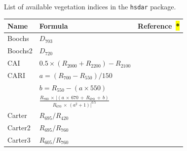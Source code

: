 \documentclass[remotesensing,article,accept,moreauthors,pdftex]{Definitions/mdpi}
\begin{document}
\begin{paracol}{2}
\subsection{}
\vspace{-12pt}
\renewcommand{\thespecialtable}{A\arabic{specialtable}}
\begin{specialtable}[H]
\setlength{\tabcolsep}{10.4mm}
{
	\caption{List of available vegetation indices in the \texttt{hsdar} package.}
	\begin{tabular}{lll}\toprule
		\bfseries{Name} & \bfseries{Formula}                                                                                   & \bfseries{Reference~\hl{*}} %
         \\		\midrule
		Boochs          & $D_{703}$                                                                                            &~\cite{boochs1990}             \\
		Boochs2         & $D_{720}$                                                                                            &~\cite{boochs1990}             \\
		CAI             & $0.5 \times (R_{2000} + R_{2200}) -R_{2100}$                                                         &~\cite{nagler2003}             \\
		\midrule
		CARI            & $a = (R_{700}-R_{550}) / 150$                                                                        &~\cite{walthall1994}           \\
		& $b = R_{550}-(a\times 550)$                                                                          &                               \\
		& $\frac{R_{700}\,\times\, | (a\,\times\,670\,+\,R_{670}\,+\,b)}{R_{670}\,\times\,(a^2+1)| ^{0.5}}$                       &                               \\
		\midrule
		Carter          & $R_{695}/R_{420}$                                                                                    &~\cite{carter1994}             \\
		Carter2         & $R_{695}/R_{760}$                                                                                    &~\cite{carter1994}             \\
		Carter3         & $R_{605}/R_{760}$                                                                                    &~\cite{carter1994}             \\

\end{tabular}}
\end{specialtable}
\end{paracol}
\end{document}
